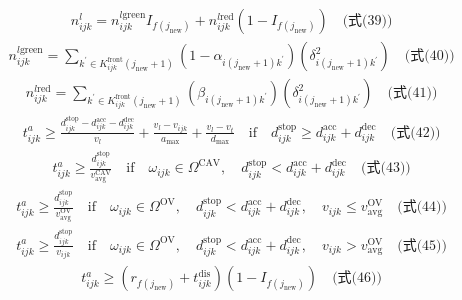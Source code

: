 \documentclass[UTF8,11pt]{ctexart}
\begin{document}
\[\begin{aligned}&\quad n^{l}_{ijk} = n^{l \text{green}}_{ijk} I_{f(j_{\text{new}})} + n^{l \text{red}}_{ijk} (1 - I_{f(j_{\text{new}})}) \quad \text{(式(39))}\end{aligned}\]
\[\begin{aligned}&\quad n^{l \text{green}}_{ijk} = \sum_{k^{\prime} \in K^{\text{front}}_{ijk}(j_{\text{new}}+1)} (1 - \alpha_{i(j_{\text{new}}+1)k^{\prime}})(\delta^{2}_{i(j_{\text{new}}+1)k^{\prime}}) \quad \text{(式(40))}\end{aligned}\]
\[\begin{aligned}&\quad n^{l \text{red}}_{ijk} = \sum_{k^{\prime} \in K^{\text{front}}_{ijk}(j_{\text{new}}+1)} (\beta_{i(j_{\text{new}}+1)k^{\prime}})(\delta^{2}_{i(j_{\text{new}}+1)k^{\prime}}) \quad \text{(式(41))}\end{aligned}\]
\[\begin{aligned}&\quad t^{a}_{ijk} \geq \frac{d^{\text{stop}}_{ijk} - d^{\text{acc}}_{ijk} - d^{\text{dec}}_{ijk}}{v_{l}} + \frac{v_{l} - v_{ijk}}{a_{\max}} + \frac{v_{l} - v_{t}}{d_{\max}} \quad \text{if} \quad d^{\text{stop}}_{ijk} \geq d^{\text{acc}}_{ijk} + d^{\text{dec}}_{ijk} \quad \text{(式(42))}\end{aligned}\]
\[\begin{aligned}&\quad t^{a}_{ijk} \geq \frac{d^{\text{stop}}_{ijk}}{v^{\text{CAV}}_{\text{avg}}} \quad \text{if} \quad \omega_{ijk} \in \Omega^{\text{CAV}}, \quad d^{\text{stop}}_{ijk} < d^{\text{acc}}_{ijk} + d^{\text{dec}}_{ijk} \quad \text{(式(43))}\end{aligned}\]
\[\begin{aligned}&\quad t^{a}_{ijk} \geq \frac{d^{\text{stop}}_{ijk}}{v^{\text{OV}}_{\text{avg}}} \quad \text{if} \quad \omega_{ijk} \in \Omega^{\text{OV}}, \quad d^{\text{stop}}_{ijk} < d^{\text{acc}}_{ijk} + d^{\text{dec}}_{ijk}, \quad v_{ijk} \leq v^{\text{OV}}_{\text{avg}} \quad \text{(式(44))}\end{aligned}\]
\[\begin{aligned}&\quad t^{a}_{ijk} \geq \frac{d^{\text{stop}}_{ijk}}{v_{ijk}} \quad \text{if} \quad \omega_{ijk} \in \Omega^{\text{OV}}, \quad d^{\text{stop}}_{ijk} < d^{\text{acc}}_{ijk} + d^{\text{dec}}_{ijk}, \quad v_{ijk} > v^{\text{OV}}_{\text{avg}} \quad \text{(式(45))}\end{aligned}\]
\[\begin{aligned}&\quad t^{a}_{ijk} \geq (r_{f(j_{\text{new}})} + t^{\text{dis}}_{ijk})(1 - I_{f(j_{\text{new}})}) \quad \text{(式(46))}\end{aligned}\]
\end{document}
